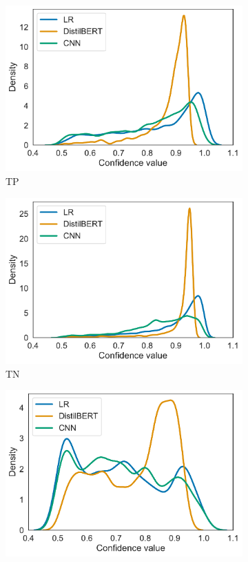 \begin{figure}[t]
    \centering
    \begin{subfigure}{.49\textwidth}
        \includegraphics[scale=.4]{Figures/confidence-densities-seen-tp.pdf}
        \caption{TP}
    \end{subfigure}
    \begin{subfigure}{.49\textwidth}
        \includegraphics[scale=.4]{Figures/confidence-densities-seen-tn.pdf}
        \caption{TN}
    \end{subfigure}
    \begin{subfigure}{.49\textwidth}
        \includegraphics[scale=.4]{Figures/confidence-densities-seen-fp.pdf}

\end{subfigure}
\end{figure}
